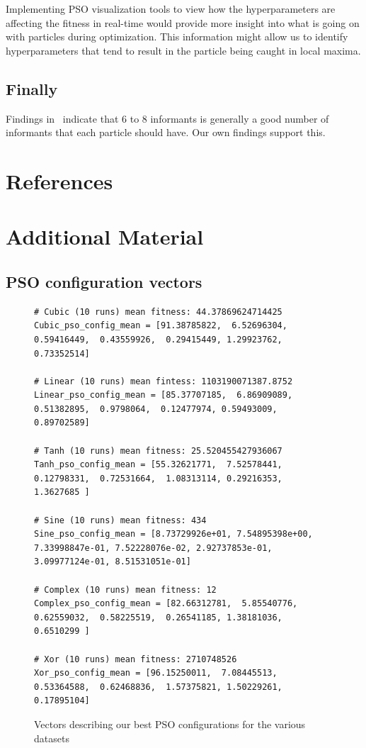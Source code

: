 \documentclass[12pt]{article}
\begin{document}
Implementing PSO visualization tools to view how the hyperparameters are affecting the fitness in real-time would provide more insight into what is going on with particles during optimization. 
This information might allow us to identify hyperparameters that tend to result in the particle being caught in local maxima.

\subsection{Finally}
Findings in~\autocite{garcia-nietoWhySixInformants2012,garcia-nietoEmpiricalComputationQuasioptimal2011} indicate that 6 to 8 informants is generally a good number of informants that each particle should have. 
Our own findings support this.

\pagebreak
\appendix

\section{References}
\printbibliography

\newpage
\section{Additional Material}
\subsection{PSO configuration vectors}\label{app:PSOconf}
\begin{figure}[h]
    \begin{verbatim}
# Cubic (10 runs) mean fitness: 44.37869624714425
Cubic_pso_config_mean = [91.38785822,  6.52696304,  0.59416449,  0.43559926,  0.29415449, 1.29923762,  0.73352514]

# Linear (10 runs) mean fintess: 1103190071387.8752
Linear_pso_config_mean = [85.37707185,  6.86909089,  0.51382895,  0.9798064,  0.12477974, 0.59493009,  0.89702589]

# Tanh (10 runs) mean fitness: 25.520455427936067
Tanh_pso_config_mean = [55.32621771,  7.52578441,  0.12798331,  0.72531664,  1.08313114, 0.29216353,  1.3627685 ]

# Sine (10 runs) mean fitness: 434
Sine_pso_config_mean = [8.73729926e+01, 7.54895398e+00, 7.33998847e-01, 7.52228076e-02, 2.92737853e-01, 3.09977124e-01, 8.51531051e-01]

# Complex (10 runs) mean fitness: 12
Complex_pso_config_mean = [82.66312781,  5.85540776,  0.62559032,  0.58225519,  0.26541185, 1.38181036,  0.6510299 ]

# Xor (10 runs) mean fitness: 2710748526
Xor_pso_config_mean = [96.15250011,  7.08445513,  0.53364588,  0.62468836,  1.57375821, 1.50229261,  0.17895104]

    \end{verbatim}
    \caption{Vectors describing our best PSO configurations for the various datasets}
    \label{minted:psoVec}
\end{figure}
\end{document}

